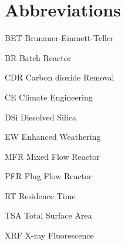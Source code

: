\chapter*{Abbreviations}
\begin{abbreviations}
\item[BET] Brunauer-Emmett-Teller
\item[BR] Batch Reactor
\item[CDR] Carbon dioxide Removal
\item[CE] Climate Engineering
\item[DSi] Dissolved Silica
\item[EW] Enhanced Weathering
\item[MFR] Mixed Flow Reactor
\item[PFR] Plug Flow Reactor
\item[RT] Residence Time
\item[TSA] Total Surface Area
\item[XRF] X-ray Fluorescence
\end{abbreviations}